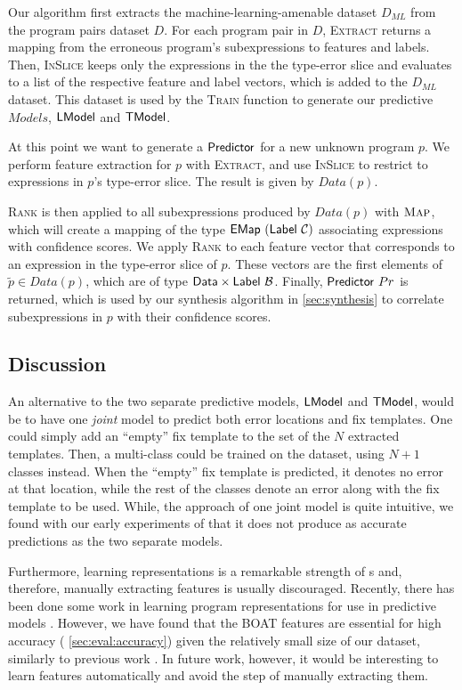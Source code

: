 

Our algorithm first extracts the machine-learning-amenable dataset $D_{ML}$
from the program pairs dataset $D$. For each program pair in $D$,
\textsc{Extract} returns a mapping from the erroneous program's subexpressions
to features and labels. Then, \textsc{InSlice} keeps only the expressions in
the the type-error slice and evaluates to a list of the respective feature and
label vectors, which is added to the $D_{ML}$ dataset. This dataset
is used by the \textsc{Train} function to generate our predictive $Models$, \ie
$\mathsf{LModel}$ and $\mathsf{TModel}$.

At this point we want to generate a $\mathsf{Predictor}$ for a new unknown program
$p$. We perform feature extraction for $p$ with \textsc{Extract}, and use
\textsc{InSlice} to restrict to expressions in $p$'s type-error slice.
The result is given by $Data(p)$.

\textsc{Rank} is then applied to all subexpressions produced by $Data(p)$ with
$\textsc{Map}$, which will create a mapping of the type
$\mathsf{EMap}\ (\mathsf{Label}\ \mathcal{C})$ associating expressions with confidence scores. We
apply \textsc{Rank} to each feature vector that corresponds to an expression in
the type-error slice of $p$. These vectors are the first elements of $\tilde{p}
\in Data(p)$, which are of type $\mathsf{Data} \times \mathsf{Label}\ \mathcal{B}$. Finally,
$\mathsf{Predictor}\ Pr$ is returned, which is used by our synthesis algorithm in
\autoref{sec:synthesis} to correlate subexpressions in $p$ with their confidence
scores.

\subsection{Discussion}
\label{sec:templ-pred:discuss}

An alternative to the two separate predictive models, $\mathsf{LModel}$ and $\mathsf{TModel}$,
would be to have one \textit{joint} model to predict both error locations and
fix templates. One could simply add an ``empty'' fix template to the set of the
$N$ extracted templates. Then, a multi-class \dnn{} could be trained on the
dataset, using $N + 1$ classes instead. When the ``empty'' fix template is
predicted, it denotes no error at that location, while the rest of the classes
denote an error along with the fix template to be used. While, the approach of
one joint model is quite intuitive, we found with our early experiments of
\toolname that it does not produce as accurate predictions as the two separate
models.

Furthermore, learning representations is a remarkable strength of \dnn{}s and,
therefore, manually extracting features is usually discouraged. Recently, there
has been done some work in learning program representations for use in
predictive models \citep{Allamanis_2017, Bhoopchand_2016}. However, we have
found that the BOAT features are essential for high accuracy (\ie
\autoref{sec:eval:accuracy}) given the relatively small size of our dataset,
similarly to previous work \citep{Seidel:2017}. In future work, however, it
would be interesting to learn features automatically and avoid the step of
manually extracting them.
